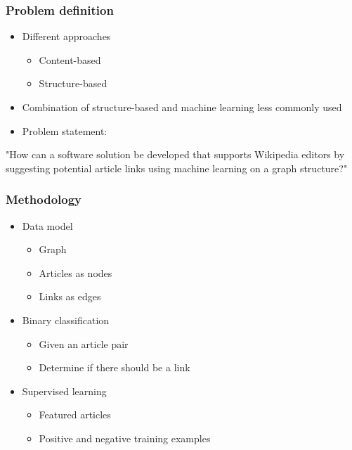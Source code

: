 \begin{frame}
    \frametitle{Problem definition}
    \centering
    \begin{itemize}
      \item Different approaches
        \begin{itemize}
          \item Content-based
          \item Structure-based
        \end{itemize}
      \item Combination of structure-based and machine learning less commonly used
      \item Problem statement:
    \end{itemize}
    "How can a software solution be developed that supports Wikipedia editors by suggesting potential article links using machine learning on a graph structure?"
\end{frame}

\begin{frame}
    \frametitle{Methodology}
    \centering
    \begin{itemize}
      \item Data model
        \begin{itemize}
          \item Graph
          \item Articles as nodes
          \item Links as edges
        \end{itemize}
      \item Binary classification
        \begin{itemize}
          \item Given an article pair
          \item Determine if there should be a link
        \end{itemize}
      \item Supervised learning
        \begin{itemize}
          \item Featured articles
          \item Positive and negative training examples
        \end{itemize}
    \end{itemize}
\end{frame}

